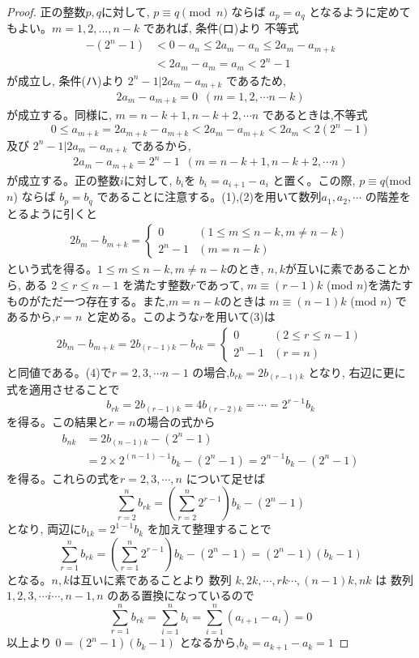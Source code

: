 \begin{proof}
正の整数$p,q$に対して, $p\equiv q \pmod{n}$ ならば $a_p=a_q$ となるように定めてもよい。$m=1,2,\dots, n-k$ であれば, 条件(ロ)より 不等式
\begin{align*}
 -(2^n-1)&<0-a_n\le 2a_m-a_n\le 2a_m-a_{m+k} \\
 &<2a_m-a_m=a_m<2^n-1
\end{align*}
が成立し, 条件(ハ)より $2^n-1|2a_m-a_{m+k}$ であるため,
\begin{eqnarray}
2a_m-a_{m+k}=0 \,\,\,(m=1,2,\cdots n-k)
\end{eqnarray}
が成立する。同様に, $m=n-k+1, n-k+2, \cdots n$ であるときは,不等式
\[
0\le a_{m+k}=2a_{m+k}-a_{m+k}< 2a_m-a_{m+k}<2a_m<2(2^n-1)
\]
及び $2^n-1|2a_m-a_{m+k}$ であるから,
\begin{eqnarray}
2a_m-a_{m+k}=2^n-1\,\,\, (m=n-k+1,n-k+2,\cdots n)
\end{eqnarray}
が成立する。正の整数$i$に対して, $b_i$を $b_i=a_{i+1}-a_i$ と置く。この際, $p\equiv q $(mod $n$) ならば $b_p=b_q$ であることに注意する。(1),(2)を用いて数列$a_1,a_2,\cdots$ の階差をとるように引くと
\begin{eqnarray}
2b_{m}-b_{m+k}=
\begin{cases}
0 & (1\le m\le n-k, m\neq n-k)\\
2^n-1 & (m=n-k)
\end{cases}
\end{eqnarray}
という式を得る。$1\le m\le n-k, m\neq n-k$のとき, $n,k$が互いに素であることから, ある $2\le r\le n-1$ を満たす整数$r$であって, $m\equiv (r-1)k$ (mod $n$)を満たすものがただ一つ存在する。また,$m=n-k$のときは $m\equiv (n-1)k$ (mod $n$) であるから,$r=n$ と定める。このような$r$を用いて(3)は
\begin{eqnarray}
2b_{m}-b_{m+k}=2b_{(r-1)k}-b_{rk}=
\begin{cases}
0 & (2\le r\le n-1)\\
2^n-1 & (r=n)
\end{cases}
\end{eqnarray}
と同値である。(4)で$r=2,3,\cdots n-1$ の場合,$b_{rk}=2b_{(r-1)k}$ となり, 右辺に更に式を適用させることで
\[b_{rk}=2b_{(r-1)k}=4b_{(r-2)k}=\cdots =2^{r-1}b_k\]
を得る。この結果と$r=n$の場合の式から
\begin{align*}
 b_{nk}&=2b_{(n-1)k}-(2^n-1) \\
 &=2\times2^{(n-1)-1}b_k -(2^n-1)=2^{n-1}b_k-(2^n-1)
\end{align*}
を得る。これらの式を$r=2,3,\cdots, n$ について足せば
\[\displaystyle\sum_{r=2}^nb_{rk}=\left(\displaystyle\sum_{r=2}^n2^{r-1}\right)b_k -(2^n-1)\]
となり, 両辺に$b_{1k}=2^{1-1}b_k$ を加えて整理することで
\[\displaystyle\sum_{r=1}^nb_{rk}=\left(\displaystyle\sum_{r=1}^n2^{r-1}\right)b_k -(2^n-1)=(2^n-1)(b_k-1)\]
となる。$n,k$は互いに素であることより 数列 $k,2k,\cdots,rk\cdots,(n-1)k,nk$ は 数列 $1,2,3,\cdots i \cdots,n-1,n$ のある置換になっているので
\[\displaystyle\sum_{r=1}^nb_{rk}=\displaystyle\sum_{i=1}^nb_{i}=\displaystyle\sum_{i=1}^n(a_{i+1}-a_i)=0\]
以上より $0=(2^n-1)(b_k-1)$ となるから,$b_k=a_{k+1}-a_k=1$ 
\end{proof}
